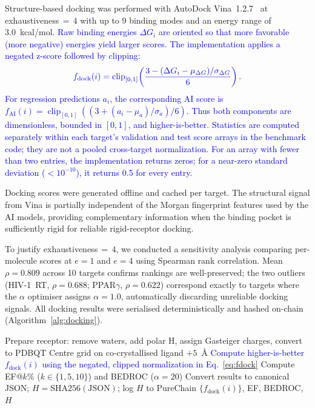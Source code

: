 \documentclass[conference]{IEEEtran}
\newcommand{\rev}[2]{\textcolor{blue}{#2}}
\begin{document}
Structure-based docking was performed with AutoDock
Vina~1.2.7~\cite{eberhardt2021autodock} at
exhaustiveness$\,{=}\,4$ with up to 9 binding modes and
an energy range of 3.0~kcal/mol.
\rev{R2.3}{Raw binding energies $\Delta G_i$ are oriented so that
more favorable (more negative) energies yield larger scores. The
implementation applies a negated z-score followed by clipping:}
\begin{equation}
\label{eq:fdock}
\textcolor{blue}{f_{\mathrm{dock}}(i)
 = \operatorname{clip}_{[0,1]}\!\left(
 \frac{3-(\Delta G_i-\mu_{\Delta G})/\sigma_{\Delta G}}{6}\right).}
\end{equation}
\rev{R2.3}{For regression predictions $a_i$, the corresponding
AI score is $f_{\mathrm{AI}}(i)=\operatorname{clip}_{[0,1]}
((3+(a_i-\mu_a)/\sigma_a)/6)$. Thus both components are
dimensionless, bounded in $[0,1]$, and higher-is-better. Statistics
are computed separately within each target's validation and test
score arrays in the benchmark code; they are not a pooled
cross-target normalization. For an array with fewer than two entries,
the implementation returns zeros; for a near-zero standard deviation
($<10^{-10}$), it returns 0.5 for every entry.}


Docking scores were generated offline and cached per target.
The structural signal from Vina is partially independent
of the Morgan fingerprint features used by the AI models,
providing complementary information when the binding pocket
is sufficiently rigid for reliable rigid-receptor docking.

To justify exhaustiveness$\,{=}\,4$, we conducted a
sensitivity analysis comparing per-molecule scores at
$e{=}1$ and $e{=}4$ using Spearman rank correlation.
Mean $\rho = 0.809$ across 10 targets confirms rankings
are well-preserved; the two outliers (HIV-1~RT,
$\rho=0.688$; PPAR$\gamma$, $\rho=0.622$) correspond
exactly to targets where the $\alpha$ optimiser assigns
$\alpha=1.0$, automatically discarding unreliable
docking signals.
All docking results were serialised deterministically
and hashed on-chain (Algorithm~\ref{alg:docking}).

\begin{algorithm}[!htbp]
\scriptsize
\caption{Structure-Based Docking and Enrichment Evaluation}
\label{alg:docking}
Prepare receptor: remove waters, add polar H,
  assign Gasteiger charges, convert to PDBQT\;
Centre grid on co-crystallised ligand $+ 5$~\AA\;
\rev{R2.3}{Compute higher-is-better $f_{\mathrm{dock}}(i)$
  using the negated, clipped normalization in Eq.~\ref{eq:fdock}}\;
Compute EF@$k$\% ($k \in \{1,5,10\}$) and BEDROC
  ($\alpha = 20$)\;
Convert results to canonical JSON;
  $H = \mathrm{SHA256}(\mathrm{JSON})$;
  log $H$ to PureChain\;
\Return $\{f_{\mathrm{dock}}(i)\}$, EF, BEDROC, $H$\;
\end{algorithm}
\end{document}

